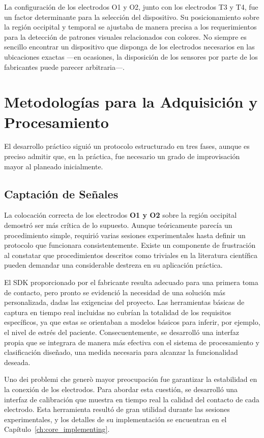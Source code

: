 La configuración de los electrodos O1 y O2, junto con los electrodos T3 y T4, fue un factor determinante para la selección del dispositivo. Su posicionamiento sobre la región occipital y temporal se ajustaba de manera precisa a los requerimientos para la detección de patrones visuales relacionados con colores. No siempre es sencillo encontrar un dispositivo que disponga de los electrodos necesarios en las ubicaciones exactas —en ocasiones, la disposición de los sensores por parte de los fabricantes puede parecer arbitraria—.

\section{Metodologías para la Adquisición y Procesamiento}
El desarrollo práctico siguió un protocolo estructurado en tres fases, aunque es preciso admitir que, en la práctica, fue necesario un grado de improvisación mayor al planeado inicialmente.

    \subsection{Captación de Señales}
    La colocación correcta de los electrodos \textbf{O1 y O2} sobre la región occipital demostró ser más crítica de lo supuesto. Aunque teóricamente parecía un procedimiento simple, requirió varias sesiones experimentales hasta definir un protocolo que funcionara consistentemente. Existe un componente de frustración al constatar que procedimientos descritos como triviales en la literatura científica pueden demandar una considerable destreza en su aplicación práctica.
    
    El SDK proporcionado por el fabricante resulta adecuado para una primera toma de contacto, pero pronto se evidenció la necesidad de una solución más personalizada, dadas las exigencias del proyecto. Las herramientas básicas de captura en tiempo real incluidas no cubrían la totalidad de los requisitos específicos, ya que estas se orientaban a modelos básicos para inferir, por ejemplo, el nivel de estrés del paciente. Consecuentemente, se desarrolló una interfaz propia que se integrara de manera más efectiva con el sistema de procesamiento y clasificación diseñado, una medida necesaria para alcanzar la funcionalidad deseada.
    
    Uno dei problemi che generò mayor preocupación fue garantizar la estabilidad en la conexión de los electrodos. Para abordar esta cuestión, se desarrolló una interfaz de calibración que muestra en tiempo real la calidad del contacto de cada electrodo. Esta herramienta resultó de gran utilidad durante las sesiones experimentales, y los detalles de su implementación se encuentran en el Capítulo~\ref{ch:core_implementing}.

